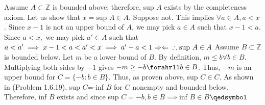 \documentclass[12pt]{article}
\newcommand{\Z}{\mathbb{Z}}
\begin{document}
\begin{solution}\newline
Assume $A\subset\Z$ is bounded above; therefore, sup $A$ exists by the completeness axiom.\newline
Let us show that $x=\text{sup }A\in A$.\newline
Suppose not.\newline
This implies $\forall a\in A, a<x$.\newline
Since $x-1$ is not an upper bound of $A$, we may pick $a\in A$ such that $x-1<a$.\newline
Since $a<x,$ we may pick $a'\in A$ such that $a<a'\newline
\implies x-1<a<a'<x\newline
\implies a'-a<1 \Rightarrow\Leftarrow\newline
\therefore \text{sup }A\in A$\newline
Assume $B\subset\Z$ is bounded below.\newline
Let $m$ be a lower bound of $B$.\newline
By definition, $m\leq b\forall b\in B$.\newline
Multiplying both sides by $-1$ gives $-m\geq -b \forahrll b\in B$.\newline
Thus, $-m$ is an upper bound for $C=\{-b:b\in B\}.$\newline
Thus, as proven above, sup $C\in C$.\newline
As shown in (Problem 1.6.19), sup $C$=-inf $B$ for $C$ nonempty and bounded below.\newline
Therefore, inf $B$ exists and since sup $C=-b,b\in B\implies $inf $B\in B$\flushright$\qedsymbol$
\end{solution}
\end{document}

